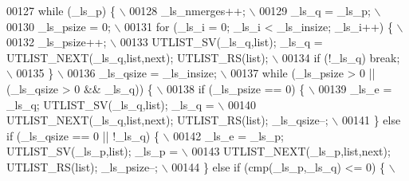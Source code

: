 \begin{DoxyCode}
00127 \textcolor{preprocessor}{      while (\_ls\_p) \{                                                                          \(\backslash\)}
00128 \textcolor{preprocessor}{        \_ls\_nmerges++;                                                                         \(\backslash\)}
00129 \textcolor{preprocessor}{        \_ls\_q = \_ls\_p;                                                                         \(\backslash\)}
00130 \textcolor{preprocessor}{        \_ls\_psize = 0;                                                                         \(\backslash\)}
00131 \textcolor{preprocessor}{        for (\_ls\_i = 0; \_ls\_i < \_ls\_insize; \_ls\_i++) \{                                         \(\backslash\)}
00132 \textcolor{preprocessor}{          \_ls\_psize++;                                                                         \(\backslash\)}
00133 \textcolor{preprocessor}{          UTLIST\_SV(\_ls\_q,list); \_ls\_q = UTLIST\_NEXT(\_ls\_q,list,next); UTLIST\_RS(list);        \(\backslash\)}
00134 \textcolor{preprocessor}{          if (!\_ls\_q) break;                                                                   \(\backslash\)}
00135 \textcolor{preprocessor}{        \}                                                                                      \(\backslash\)}
00136 \textcolor{preprocessor}{        \_ls\_qsize = \_ls\_insize;                                                                \(\backslash\)}
00137 \textcolor{preprocessor}{        while (\_ls\_psize > 0 || (\_ls\_qsize > 0 && \_ls\_q)) \{                                    \(\backslash\)}
00138 \textcolor{preprocessor}{          if (\_ls\_psize == 0) \{                                                                \(\backslash\)}
00139 \textcolor{preprocessor}{            \_ls\_e = \_ls\_q; UTLIST\_SV(\_ls\_q,list); \_ls\_q =                                      \(\backslash\)}
00140 \textcolor{preprocessor}{              UTLIST\_NEXT(\_ls\_q,list,next); UTLIST\_RS(list); \_ls\_qsize--;                      \(\backslash\)}
00141 \textcolor{preprocessor}{          \} else if (\_ls\_qsize == 0 || !\_ls\_q) \{                                               \(\backslash\)}
00142 \textcolor{preprocessor}{            \_ls\_e = \_ls\_p; UTLIST\_SV(\_ls\_p,list); \_ls\_p =                                      \(\backslash\)}
00143 \textcolor{preprocessor}{              UTLIST\_NEXT(\_ls\_p,list,next); UTLIST\_RS(list); \_ls\_psize--;                      \(\backslash\)}
00144 \textcolor{preprocessor}{          \} else if (cmp(\_ls\_p,\_ls\_q) <= 0) \{                                                  \(\backslash\)}

\end{DoxyCode}
